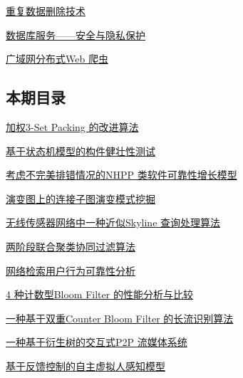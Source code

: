 \documentclass[a4paper]{article}
\begin{document}
\href{http://www.jos.org.cn/ch/reader/download_pdf.aspx?file_no=3761&year_id=2010&quarter_id=5&falg=1}{重复数据删除技术}

\href{http://www.jos.org.cn/ch/reader/download_pdf.aspx?file_no=3746&year_id=2010&quarter_id=5&falg=1}{数据库服务——安全与隐私保护}

\href{http://www.jos.org.cn/ch/reader/download_pdf.aspx?file_no=3725&year_id=2010&quarter_id=5&falg=1}{广域网分布式Web 爬虫}

\subsection{本期目录}
\href{http://www.jos.org.cn/ch/reader/download_pdf.aspx?file_no=3524&year_id=2010&quarter_id=5&falg=1}{加权3-Set Packing 的改进算法}

\href{http://www.jos.org.cn/ch/reader/download_pdf.aspx?file_no=3544&year_id=2010&quarter_id=5&falg=1}{基于状态机模型的构件健壮性测试}

\href{http://www.jos.org.cn/ch/reader/download_pdf.aspx?file_no=3539&year_id=2010&quarter_id=5&falg=1}{考虑不完美排错情况的NHPP 类软件可靠性增长模型}

\href{http://www.jos.org.cn/ch/reader/download_pdf.aspx?file_no=3531&year_id=2010&quarter_id=5&falg=1}{演变图上的连接子图演变模式挖掘}

\href{http://www.jos.org.cn/ch/reader/download_pdf.aspx?file_no=3703&year_id=2010&quarter_id=5&falg=1}{无线传感器网络中一种近似Skyline 查询处理算法}

\href{http://www.jos.org.cn/ch/reader/download_pdf.aspx?file_no=3758&year_id=2010&quarter_id=5&falg=1}{两阶段联合聚类协同过滤算法}

\href{http://www.jos.org.cn/ch/reader/download_pdf.aspx?file_no=3744&year_id=2010&quarter_id=5&falg=1}{网络检索用户行为可靠性分析}

\href{http://www.jos.org.cn/ch/reader/download_pdf.aspx?file_no=3495&year_id=2010&quarter_id=5&falg=1}{4 种计数型Bloom Filter 的性能分析与比较}

\href{http://www.jos.org.cn/ch/reader/download_pdf.aspx?file_no=3568&year_id=2010&quarter_id=5&falg=1}{一种基于双重Counter Bloom Filter 的长流识别算法}

\href{http://www.jos.org.cn/ch/reader/download_pdf.aspx?file_no=3599&year_id=2010&quarter_id=5&falg=1}{一种基于衍生树的交互式P2P 流媒体系统}

\href{http://www.jos.org.cn/ch/reader/download_pdf.aspx?file_no=3415&year_id=2010&quarter_id=5&falg=1}{基于反馈控制的自主虚拟人感知模型}
\end{document}
